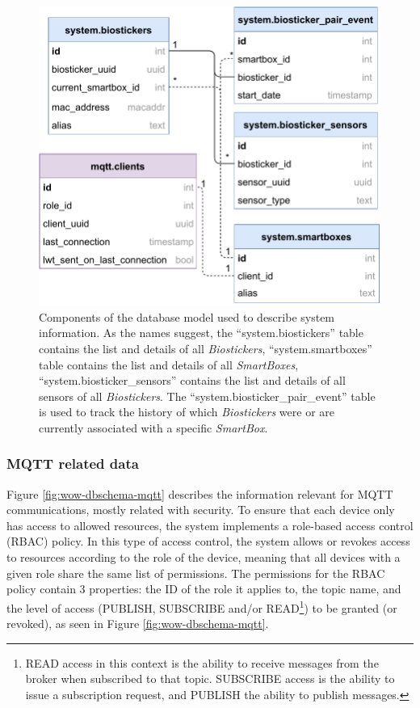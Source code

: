 \begin{figure}[H]
    \centering
    \includegraphics[width=0.55\linewidth]{images/database-schema-system.pdf}
    \caption[Components of the database model used to describe system information.]{
    Components of the database model used to describe system information. As the names suggest, the ``system.biostickers'' table contains the list and details of all \textit{Biostickers}, ``system.smartboxes'' table contains the list and details of all \textit{SmartBoxes}, ``system.biosticker\_sensors'' contains the list and details of all sensors of all \textit{Biostickers}. The ``system.biosticker\_pair\_event'' table is used to track the history of which \textit{Biostickers} were or are currently associated with a specific \textit{SmartBox}.}
    \label{fig:wow-dbschema-system}
\end{figure}

\subsubsection{MQTT related data}

Figure \ref{fig:wow-dbschema-mqtt} describes the information relevant for \acs{MQTT} communications, mostly related with security. To ensure that each device only has access to allowed resources, the system implements a role-based access control (\acs{RBAC}) policy. 
In this type of access control, the system allows or revokes access to resources according to the role of the device, meaning that all devices with a given role share the same list of permissions. The permissions for the \acs{RBAC} policy contain 3 properties: the ID of the role it applies to, the topic name, and the level of access (PUBLISH, SUBSCRIBE and/or READ\footnote{READ access in this context is the ability to receive messages from the broker when subscribed to that topic. SUBSCRIBE access is the ability to issue a subscription request, and PUBLISH the ability to publish messages.}) to be granted (or revoked), as seen in Figure \ref{fig:wow-dbschema-mqtt}. 

